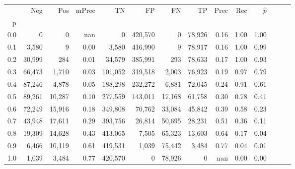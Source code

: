 \begin{tabular}{rrrrrrrrrrrrrr}
\toprule
{} &     Neg &     Pos & mPrec &       TN &       FP &      FN &      TP &  Prec &   Rec & $\hat{p}$ \\
p   &         &         &       &          &          &         &         &       &       &           \\
\midrule
0.0 &       0 &       0 &   nan &        0 &  420,570 &       0 &  78,926 &  0.16 &  1.00 &      1.00 \\
0.1 &   3,580 &       9 &  0.00 &    3,580 &  416,990 &       9 &  78,917 &  0.16 &  1.00 &      0.99 \\
0.2 &  30,999 &     284 &  0.01 &   34,579 &  385,991 &     293 &  78,633 &  0.17 &  1.00 &      0.93 \\
0.3 &  66,473 &   1,710 &  0.03 &  101,052 &  319,518 &   2,003 &  76,923 &  0.19 &  0.97 &      0.79 \\
0.4 &  87,246 &   4,878 &  0.05 &  188,298 &  232,272 &   6,881 &  72,045 &  0.24 &  0.91 &      0.61 \\
0.5 &  89,261 &  10,287 &  0.10 &  277,559 &  143,011 &  17,168 &  61,758 &  0.30 &  0.78 &      0.41 \\
0.6 &  72,249 &  15,916 &  0.18 &  349,808 &   70,762 &  33,084 &  45,842 &  0.39 &  0.58 &      0.23 \\
0.7 &  43,948 &  17,611 &  0.29 &  393,756 &   26,814 &  50,695 &  28,231 &  0.51 &  0.36 &      0.11 \\
0.8 &  19,309 &  14,628 &  0.43 &  413,065 &    7,505 &  65,323 &  13,603 &  0.64 &  0.17 &      0.04 \\
0.9 &   6,466 &  10,119 &  0.61 &  419,531 &    1,039 &  75,442 &   3,484 &  0.77 &  0.04 &      0.01 \\
1.0 &   1,039 &   3,484 &  0.77 &  420,570 &        0 &  78,926 &       0 &   nan &  0.00 &      0.00 \\
\bottomrule
\end{tabular}
